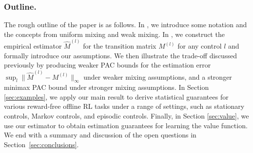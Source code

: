 \documentclass[opre,sglanonrev]{informs4}
\numberwithin{equation}{section}
\begin{document}
{\subsubsection*{Outline.} The rough outline of the paper is as follows. 
In , we introduce some notation and the concepts from uniform mixing and weak mixing. 
In , we construct the empirical estimator $\hat{M}^{(l)}$ for the transition matrix $M^{(l)}$ for any control $l$ and formally introduce our assumptions. 
We then illustrate the trade-off discussed previously by producing weaker PAC bounds for the estimation error $\sup_{l}\|\hat{M}^{(l)}-M^{(l)}\|_{\infty}$ under weaker mixing assumptions, and a stronger minimax PAC bound under stronger mixing assumptions. 
In Section \ref{sec:examples}, we apply our main result to derive statistical guarantees for various reward-free offline RL tasks under a range of settings, such as stationary controls, Markov controls, and episodic controls. 
Finally, in Section \ref{sec:value}, we use our estimator to obtain estimation guarantees for learning the value function. 
We end with a summary and discussion of the open questions in Section~\ref{sec:conclusions}.

}
\end{document}
